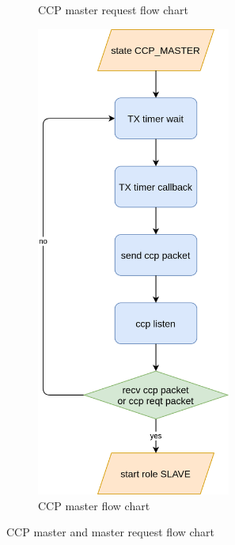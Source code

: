 \documentclass[\main/thesis.tex]{subfiles}
\begin{document}
\begin{figure}
\begin{subfigure}[b]{0.47\textwidth}
\begin{center}
        \end{center}
        \caption{CCP master request flow chart}
        \label{fig:ccp_master_reqt_flow_chart}
    \end{subfigure}
    \hfill
    \begin{subfigure}[b]{0.47\textwidth}
        \begin{center}
            \includegraphics[width=0.7\textwidth]{ccp_master_flow_chart.png}
        \end{center}
        \caption{CCP master flow chart}
        \label{fig:ccp_master_flow_chart}
    \end{subfigure}
    \caption{CCP master and master request flow chart}
\end{figure}
\end{document}
